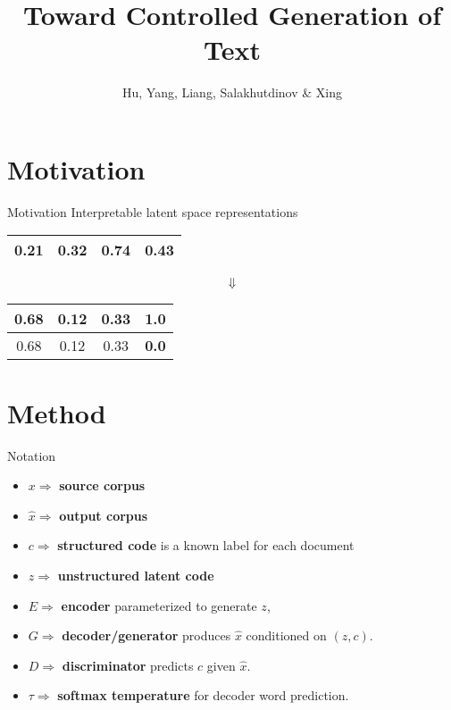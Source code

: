 \documentclass{beamer}
\title{Toward Controlled Generation of Text}
\date{}
\author{Hu, Yang, Liang, Salakhutdinov \& Xing}
\institute{ICML 2017}
\begin{document}
  \maketitle

    \section{Motivation}
    \begin{frame}{Motivation}
      Interpretable latent space representations
      \begin{center}
        \begin{tabular}{ | c | c | c | c | }
          \hline
          0.21 & 0.32 & 0.74 & 0.43 \\  
          \hline
        \end{tabular}
        {\Huge$$\Downarrow$$}
        \begin{tabular}{ | c | c | c | c | }
          \hline
          0.68 & 0.12 & 0.33 & {\color{red}\textbf{1.0}} \\  
          \hline
          \hline
          0.68 & 0.12 & 0.33 & {\color{red}\textbf{0.0}} \\  
          \hline
        \end{tabular}
      \end{center}
    \end{frame}

  \section{Method}
  \begin{frame}{Notation}
    \begin{itemize}
      \item $x \Rightarrow$ \textbf{source corpus}
      \item $\hat{x} \Rightarrow$ \textbf{output corpus}
      \item $c \Rightarrow$ \textbf{structured code} is a known label for each document
      \item $z \Rightarrow$ \textbf{unstructured latent code}
      \item $E \Rightarrow$ \textbf{encoder} parameterized to generate $z$, 
      \item $G \Rightarrow$ \textbf{decoder/generator} produces $\hat{x}$ conditioned on $(z, c)$.
      \item $D \Rightarrow$ \textbf{discriminator} predicts $c$ given $\hat{x}$.
      \item $\tau \Rightarrow$ \textbf{softmax temperature} for decoder word prediction.
    \end{itemize}
  \end{frame}
\end{document}
